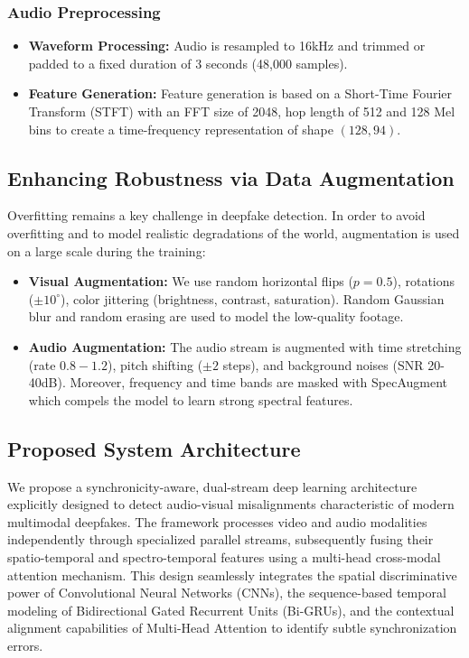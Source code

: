 \documentclass[conference]{IEEEtran}
\begin{document}
\subsubsection{Audio Preprocessing}
\begin{itemize}
    \item \textbf{Waveform Processing:} Audio is resampled to 16kHz and trimmed or padded to a fixed duration of 3 seconds (48,000 samples).
    \item \textbf{Feature Generation:} Feature generation is based on a Short-Time Fourier Transform (STFT)\cite{stft} with an FFT size of 2048, hop length of 512 and 128 Mel bins to create a time-frequency representation of shape $(128, 94)$.
\end{itemize}


\subsection{Enhancing Robustness via Data Augmentation}
Overfitting remains a key challenge in deepfake detection. In order to avoid overfitting and to model realistic degradations of the world, augmentation is used on a large scale during the training:

\begin{itemize}
    \item \textbf{Visual Augmentation:} We use random horizontal flips ($p=0.5$), rotations ($\pm 10^\circ$), color jittering (brightness, contrast, saturation). Random Gaussian blur and random erasing are used to model the low-quality footage.
    \item \textbf{Audio Augmentation:} The audio stream is augmented with time stretching (rate $0.8-1.2$), pitch shifting ($\pm 2$ steps), and background noises (SNR 20-40dB). Moreover, frequency and time bands are masked with SpecAugment which compels the model to learn strong spectral features.
\end{itemize}

\subsection{Proposed System Architecture}

We propose a synchronicity-aware, dual-stream deep learning architecture explicitly designed to detect audio-visual misalignments characteristic of modern multimodal deepfakes. The framework processes video and audio modalities independently through specialized parallel streams, subsequently fusing their spatio-temporal and spectro-temporal features using a multi-head cross-modal attention mechanism. This design seamlessly integrates the spatial discriminative power of Convolutional Neural Networks (CNNs), the sequence-based temporal modeling of Bidirectional Gated Recurrent Units (Bi-GRUs), and the contextual alignment capabilities of Multi-Head Attention to identify subtle synchronization errors.
\end{document}
